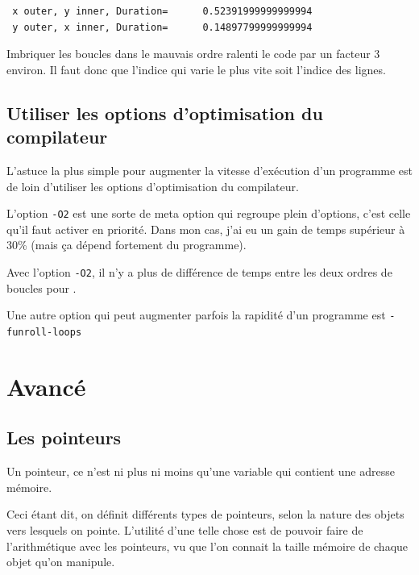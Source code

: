 \documentclass[a4paper,twoside]{article}
\begin{document}
\begin{verbatim}
 x outer, y inner, Duration=      0.52391999999999994     
 y outer, x inner, Duration=      0.14897799999999994     
\end{verbatim}

Imbriquer les boucles dans le mauvais ordre ralenti le code par un facteur 3 environ. Il faut donc que l'indice qui varie le plus vite soit l'indice des lignes. 

\subsection{Utiliser les options d'optimisation du compilateur}
L'astuce la plus simple pour augmenter la vitesse d'exécution d'un programme est de loin d'utiliser les options d'optimisation du compilateur. 

L'option \texttt{-O2} est une sorte de meta option qui regroupe plein d'options, c'est celle qu'il faut activer en priorité. Dans mon cas, j'ai eu un gain de temps supérieur à 30\% (mais ça dépend fortement du programme).

\begin{remarque}
Avec l'option \texttt{-O2}, il n'y a plus de différence de temps entre les deux ordres de boucles pour .
\end{remarque}

Une autre option qui peut augmenter parfois la rapidité d'un programme est \texttt{-funroll-loops}

\section{Avancé}
\subsection{Les pointeurs}
Un pointeur, ce n'est ni plus ni moins qu'une variable qui contient une adresse mémoire. 

Ceci étant dit, on définit différents types de pointeurs, selon la nature des objets vers lesquels on pointe. L'utilité d'une telle chose est de pouvoir faire de l'arithmétique avec les pointeurs, vu que l'on connait la taille mémoire de chaque objet qu'on manipule. 
\end{document}
